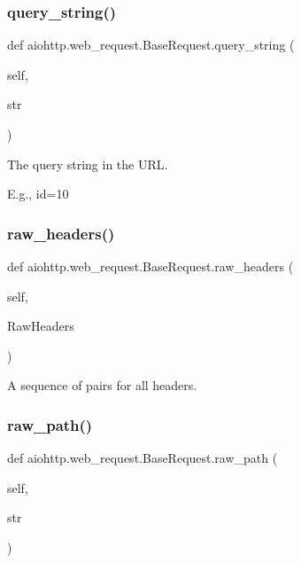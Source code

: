 \subsubsection{\texorpdfstring{query\+\_\+string()}{query\_string()}}
{\footnotesize\ttfamily def aiohttp.\+web\+\_\+request.\+Base\+Request.\+query\+\_\+string (\begin{DoxyParamCaption}\item[{}]{self,  }\item[{}]{str }\end{DoxyParamCaption})}

\begin{DoxyVerb}The query string in the URL.

E.g., id=10
\end{DoxyVerb}
 \mbox{\label{classaiohttp_1_1web__request_1_1_base_request_afa0e9d586247654418db8a17dfa8b3df}} 
\subsubsection{\texorpdfstring{raw\+\_\+headers()}{raw\_headers()}}
{\footnotesize\ttfamily def aiohttp.\+web\+\_\+request.\+Base\+Request.\+raw\+\_\+headers (\begin{DoxyParamCaption}\item[{}]{self,  }\item[{}]{Raw\+Headers }\end{DoxyParamCaption})}

\begin{DoxyVerb}A sequence of pairs for all headers.\end{DoxyVerb}
 \mbox{\label{classaiohttp_1_1web__request_1_1_base_request_a16783c16a3de7219d901000eedfa91a2}} 
\subsubsection{\texorpdfstring{raw\+\_\+path()}{raw\_path()}}
{\footnotesize\ttfamily def aiohttp.\+web\+\_\+request.\+Base\+Request.\+raw\+\_\+path (\begin{DoxyParamCaption}\item[{}]{self,  }\item[{}]{str }\end{DoxyParamCaption})}


